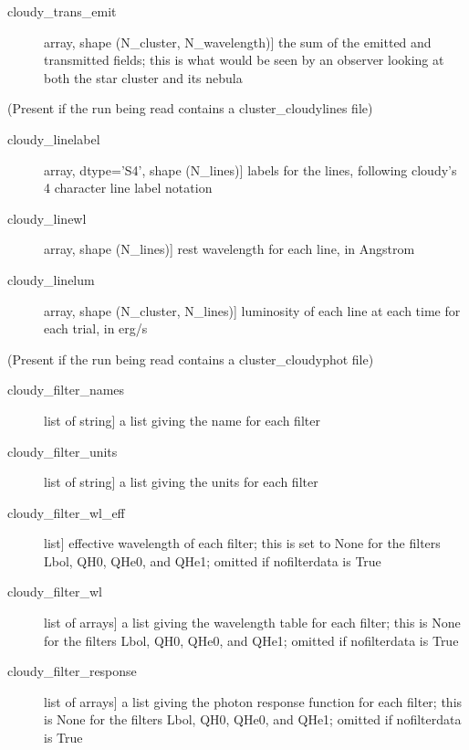\documentclass[letterpaper,10pt,english]{sphinxmanual}
\begin{document}
\begin{fulllineitems}
\begin{description}
\begin{description}
\item[{cloudy\_trans\_emit}] \leavevmode{[}array, shape (N\_cluster, N\_wavelength){]}
the sum of the emitted and transmitted fields; this is what
would be seen by an observer looking at both the star cluster
and its nebula

\end{description}

(Present if the run being read contains a cluster\_cloudylines file)
\begin{description}
\item[{cloudy\_linelabel}] \leavevmode{[}array, dtype='S4', shape (N\_lines){]}
labels for the lines, following cloudy's 4 character line label
notation

\item[{cloudy\_linewl}] \leavevmode{[}array, shape (N\_lines){]}
rest wavelength for each line, in Angstrom

\item[{cloudy\_linelum}] \leavevmode{[}array, shape (N\_cluster, N\_lines){]}
luminosity of each line at each time for each trial, in erg/s

\end{description}

(Present if the run being read contains a cluster\_cloudyphot file)
\begin{description}
\item[{cloudy\_filter\_names}] \leavevmode{[}list of string{]}
a list giving the name for each filter

\item[{cloudy\_filter\_units}] \leavevmode{[}list of string{]}
a list giving the units for each filter

\item[{cloudy\_filter\_wl\_eff}] \leavevmode{[}list{]}
effective wavelength of each filter; this is set to None for the
filters Lbol, QH0, QHe0, and QHe1; omitted if nofilterdata is
True

\item[{cloudy\_filter\_wl}] \leavevmode{[}list of arrays{]}
a list giving the wavelength table for each filter; this is
None for the filters Lbol, QH0, QHe0, and QHe1; omitted if
nofilterdata is True

\item[{cloudy\_filter\_response}] \leavevmode{[}list of arrays{]}
a list giving the photon response function for each filter;
this is None for the filters Lbol, QH0, QHe0, and QHe1; omitted
if nofilterdata is True


\end{description}
\end{description}
\end{fulllineitems}
\end{document}
